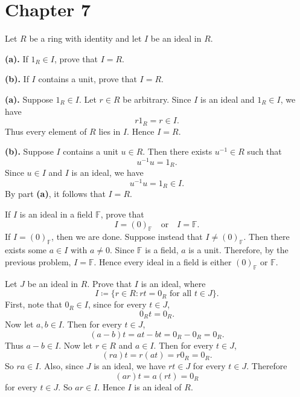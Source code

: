 
\section{Chapter 7}

\begin{problem}{
    Let $R$ be a ring with identity and let $I$ be an ideal in $R$.

    \textbf{(a).}
    If $1_R \in I$, prove that $I = R$.

    \textbf{(b).}
    If $I$ contains a unit, prove that $I = R$.
}
    \textbf{(a).}
    Suppose $1_R \in I$.
    Let $r\in R$ be arbitrary.
    Since $I$ is an ideal and $1_R\in I$, we have
    \[
        r1_R = r \in I.
    \]
    Thus every element of $R$ lies in $I$.
    Hence $I = R$.

    \textbf{(b).}
    Suppose $I$ contains a unit $u\in R$.
    Then there exists $u^{-1}\in R$ such that
    \[
        u^{-1}u = 1_R.
    \]
    Since $u\in I$ and $I$ is an ideal, we have
    \[
        u^{-1}u = 1_R \in I.
    \]
    By part \textbf{(a)}, it follows that $I = R$.
\end{problem}
\begin{problem}{
    If $I$ is an ideal in a field $\mathbb{F}$, prove that
    \[
        I = (0)_{\mathbb{F}}
        \quad\text{or}\quad
        I = \mathbb{F}.
    \]
}
    If $I = (0)_{\mathbb{F}}$, then we are done.
    Suppose instead that $I\neq (0)_{\mathbb{F}}$.
    Then there exists some $a\in I$ with $a\neq 0$.
    Since $\mathbb{F}$ is a field, $a$ is a unit.
    Therefore, by the previous problem, $I = \mathbb{F}$.
    Hence every ideal in a field is either $(0)_{\mathbb{F}}$ or $\mathbb{F}$.
\end{problem}
\begin{problem}{
    Let $J$ be an ideal in $R$.
    Prove that $I$ is an ideal, where
    \[
        I \coloneqq \{r\in R : rt = 0_R \text{ for all } t\in J\}.
    \]
}
    First, note that $0_R\in I$, since for every $t\in J$,
    \[
        0_R t = 0_R.
    \]
    Now let $a,b\in I$.
    Then for every $t\in J$,
    \[
        (a-b)t = at - bt = 0_R - 0_R = 0_R.
    \]
    Thus $a-b\in I$.
    Now let $r\in R$ and $a\in I$.
    Then for every $t\in J$,
    \[
        (ra)t = r(at) = r0_R = 0_R.
    \]
    So $ra\in I$.
    Also, since $J$ is an ideal, we have $rt\in J$ for every $t\in J$.
    Therefore
    \[
        (ar)t = a(rt) = 0_R
    \]
    for every $t\in J$.
    So $ar\in I$.
    Hence $I$ is an ideal of $R$.
\end{problem}
